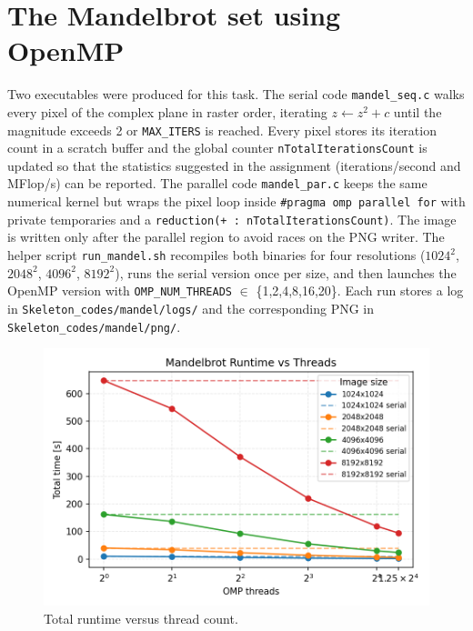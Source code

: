 
\section{The Mandelbrot set using OpenMP }

Two executables were produced for this task.  The serial code \texttt{mandel\_seq.c} walks every pixel of the complex plane in raster order, iterating $z \leftarrow z^2 + c$ until the magnitude exceeds 2 or \texttt{MAX\_ITERS} is reached.  Every pixel stores its iteration count in a scratch buffer and the global counter \texttt{nTotalIterationsCount} is updated so that the statistics suggested in the assignment (iterations/second and MFlop/s) can be reported.  The parallel code \texttt{mandel\_par.c} keeps the same numerical kernel but wraps the pixel loop inside \verb|#pragma omp parallel for| with private temporaries and a \verb|reduction(+ : nTotalIterationsCount)|.  The image is written only after the parallel region to avoid races on the PNG writer.  The helper script \texttt{run\_mandel.sh} recompiles both binaries for four resolutions ($1024^2$, $2048^2$, $4096^2$, $8192^2$), runs the serial version once per size, and then launches the OpenMP version with \texttt{OMP\_NUM\_THREADS} $\in$ \{1,2,4,8,16,20\}.  Each run stores a log in \texttt{Skeleton\_codes/mandel/logs/} and the corresponding PNG in \texttt{Skeleton\_codes/mandel/png/}.

\begin{figure}[H]
    \centering
    \includegraphics[width=0.75\linewidth]{../Skeleton_codes/mandel/plots/mandel_runtime_scaling.png}
    \caption{Total runtime versus thread count.}
    \label{fig:mandel_scaling}
\end{figure}

